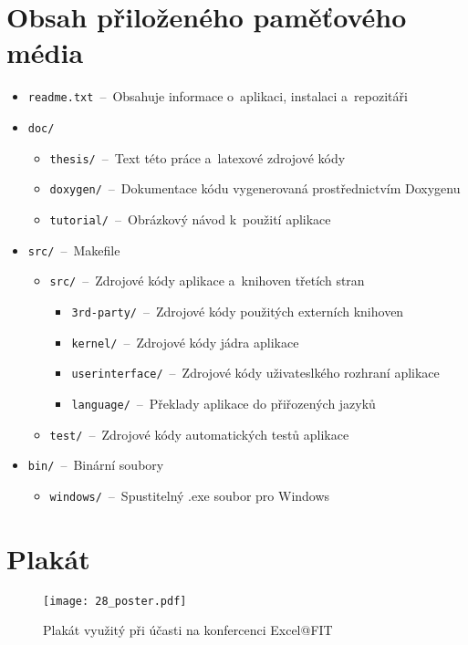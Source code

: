 \chapter{Obsah přiloženého paměťového média}
	\label{append:cd}
	\begin{itemize}
		\item \texttt{readme.txt}~--~Obsahuje informace o~aplikaci, instalaci a~repozitáři
		\item \texttt{doc/}
		\begin{itemize}
			\item \texttt{thesis/}~--~Text této práce a~latexové zdrojové kódy
			\item \texttt{doxygen/}~--~Dokumentace kódu vygenerovaná prostřednictvím Doxygenu
			\item \texttt{tutorial/}~--~Obrázkový návod k~použití aplikace
		\end{itemize}
		\item \texttt{src/}~--~Makefile
		\begin{itemize}
			\item \texttt{src/}~--~Zdrojové kódy aplikace a~knihoven třetích stran
			\begin{itemize}
				\item \texttt{3rd-party/}~--~Zdrojové kódy použitých externích knihoven
				\item \texttt{kernel/}~--~Zdrojové kódy jádra aplikace
				\item \texttt{userinterface/}~--~Zdrojové kódy uživateslkého rozhraní aplikace
				\item \texttt{language/}~--~Překlady aplikace do přiřozených jazyků
			\end{itemize}
			\item \texttt{test/}~--~Zdrojové kódy automatických testů aplikace
		\end{itemize}
		\item \texttt{bin/}~--~Binární soubory
		\begin{itemize}
			\item \texttt{windows/}~--~Spustitelný .exe soubor pro Windows
		\end{itemize}
	\end{itemize}


\chapter{Plakát} %
\newpage
\label{append:poster}
\begin{figure}[H]
	\centering
	\texttt{[image: 28\_poster.pdf]}
	\caption{Plakát využitý při účasti na konfercenci Excel@FIT}
\end{figure}


